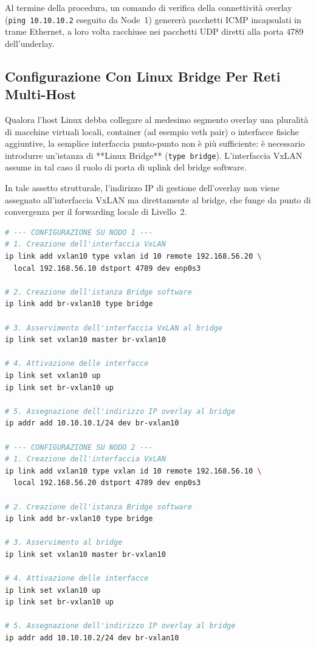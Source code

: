 \documentclass[11pt, a4paper]{article}
\begin{document}
Al termine della procedura, un comando di verifica della connettività overlay (\texttt{ping 10.10.10.2} eseguito da Node~1) genererà pacchetti ICMP incapsulati in trame Ethernet, a loro volta racchiuse nei pacchetti UDP diretti alla porta 4789 dell'underlay.

\subsection{Configurazione Con Linux Bridge Per Reti Multi-Host}

Qualora l'host Linux debba collegare al medesimo segmento overlay una pluralità di macchine virtuali locali, container (ad esempio veth pair) o interfacce fisiche aggiuntive, la semplice interfaccia punto-punto non è più sufficiente: è necessario introdurre un'istanza di **Linux Bridge** (\texttt{type bridge}). L'interfaccia VxLAN assume in tal caso il ruolo di porta di uplink del bridge software.


In tale assetto strutturale, l'indirizzo IP di gestione dell'overlay non viene assegnato all'interfaccia VxLAN ma direttamente al bridge, che funge da punto di convergenza per il forwarding locale di Livello~2.

\begin{lstlisting}[language=bash, caption={Integrazione tra interfaccia VxLAN e Linux Bridge su Node 1 e Node 2.}]
# --- CONFIGURAZIONE SU NODO 1 ---
# 1. Creazione dell'interfaccia VxLAN
ip link add vxlan10 type vxlan id 10 remote 192.168.56.20 \
  local 192.168.56.10 dstport 4789 dev enp0s3

# 2. Creazione dell'istanza Bridge software
ip link add br-vxlan10 type bridge

# 3. Asservimento dell'interfaccia VxLAN al bridge
ip link set vxlan10 master br-vxlan10

# 4. Attivazione delle interfacce
ip link set vxlan10 up
ip link set br-vxlan10 up

# 5. Assegnazione dell'indirizzo IP overlay al bridge
ip addr add 10.10.10.1/24 dev br-vxlan10

# --- CONFIGURAZIONE SU NODO 2 ---
# 1. Creazione dell'interfaccia VxLAN
ip link add vxlan10 type vxlan id 10 remote 192.168.56.10 \
  local 192.168.56.20 dstport 4789 dev enp0s3

# 2. Creazione dell'istanza Bridge software
ip link add br-vxlan10 type bridge

# 3. Asservimento al bridge
ip link set vxlan10 master br-vxlan10

# 4. Attivazione delle interfacce
ip link set vxlan10 up
ip link set br-vxlan10 up

# 5. Assegnazione dell'indirizzo IP overlay al bridge
ip addr add 10.10.10.2/24 dev br-vxlan10
\end{lstlisting}
\end{document}
